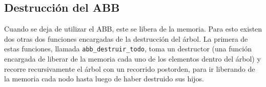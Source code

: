 \documentclass[titlepage,a4paper]{article}
\begin{document}
											\subsection{Destrucción del ABB}

Cuando se deja de utilizar el ABB, este se libera de la memoria. Para esto
existen dos otras dos funciones encargadas de la destrucción del árbol. La
primera de estas funciones, llamada \lstinline{abb_destruir_todo}, toma un
destructor (una función encargada de liberar de la memoria cada uno de los
elementos dentro del árbol) y recorre recursivamente el árbol con un recorrido
postorden, para ir liberando de la memoria cada nodo hasta
luego de haber destruido sus hijos.
\end{document}
